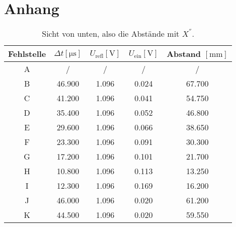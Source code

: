 \newpage
\section{Anhang}

\begin{table}
    \centering
    \caption{Sicht von unten, also die Abstände mit $X^{''}$.}
    \label{tab:1}
    \begin{tabular}{c | c c c c}
        \toprule
        Fehlstelle & $\Delta t [\si{\micro\second}] $ &  $U_{\text{refl}} [\si{\volt}]$ & $U_{\text{ein}}[\si{\volt}]$ & Abstand $[\si{\milli\meter}]$ \\
        \midrule
        A & / & / & / & / \\
        B & 46.900 & 1.096 & 0.024  & 67.700 \\
        C & 41.200 & 1.096 & 0.041  & 54.750 \\
        D & 35.400 & 1.096 & 0.052  & 46.800 \\
        E & 29.600 & 1.096 & 0.066  & 38.650 \\
        F & 23.300 & 1.096 & 0.091  & 30.300 \\
        G & 17.200 & 1.096 & 0.101  & 21.700 \\
        H & 10.800 & 1.096 & 0.113  & 13.250 \\
        I & 12.300 & 1.096 & 0.169  & 16.200 \\
        J & 46.000 & 1.096 & 0.020  & 61.200 \\
        K & 44.500 & 1.096 & 0.020  & 59.550 \\
    \end{tabular}
\end{table}

